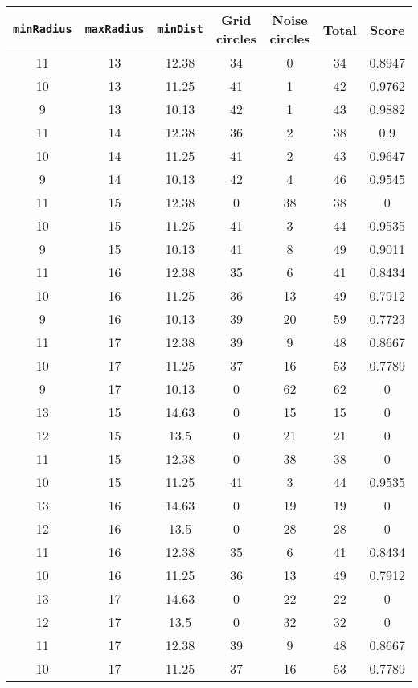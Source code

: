 \documentclass[letterpaper, 12pt]{article}
\begin{document}
\begin{longtable}{|c|c|c|c|c|c|c|}
\hline
\textbf{\texttt{minRadius}} & \textbf{\texttt{maxRadius}} & \textbf{\texttt{minDist}} & \textbf{Grid circles} & \textbf{Noise circles} & \textbf{Total} & \textbf{Score} \\
\hline
11 & 13 & 12.38 & 34 & 0 & 34 & 0.8947 \\
\hline
10 & 13 & 11.25 & 41 & 1 & 42 & 0.9762 \\
\hline
9 & 13 & 10.13 & 42 & 1 & 43 & 0.9882 \\
\hline
11 & 14 & 12.38 & 36 & 2 & 38 & 0.9 \\
\hline
10 & 14 & 11.25 & 41 & 2 & 43 & 0.9647 \\
\hline
9 & 14 & 10.13 & 42 & 4 & 46 & 0.9545 \\
\hline
11 & 15 & 12.38 & 0 & 38 & 38 & 0 \\
\hline
10 & 15 & 11.25 & 41 & 3 & 44 & 0.9535 \\
\hline
9 & 15 & 10.13 & 41 & 8 & 49 & 0.9011 \\
\hline
11 & 16 & 12.38 & 35 & 6 & 41 & 0.8434 \\
\hline
10 & 16 & 11.25 & 36 & 13 & 49 & 0.7912 \\
\hline
9 & 16 & 10.13 & 39 & 20 & 59 & 0.7723 \\
\hline
11 & 17 & 12.38 & 39 & 9 & 48 & 0.8667 \\
\hline
10 & 17 & 11.25 & 37 & 16 & 53 & 0.7789 \\
\hline
9 & 17 & 10.13 & 0 & 62 & 62 & 0 \\
\hline
13 & 15 & 14.63 & 0 & 15 & 15 & 0 \\
\hline
12 & 15 & 13.5 & 0 & 21 & 21 & 0 \\
\hline
11 & 15 & 12.38 & 0 & 38 & 38 & 0 \\
\hline
10 & 15 & 11.25 & 41 & 3 & 44 & 0.9535 \\
\hline
13 & 16 & 14.63 & 0 & 19 & 19 & 0 \\
\hline
12 & 16 & 13.5 & 0 & 28 & 28 & 0 \\
\hline
11 & 16 & 12.38 & 35 & 6 & 41 & 0.8434 \\
\hline
10 & 16 & 11.25 & 36 & 13 & 49 & 0.7912 \\
\hline
13 & 17 & 14.63 & 0 & 22 & 22 & 0 \\
\hline
12 & 17 & 13.5 & 0 & 32 & 32 & 0 \\
\hline
11 & 17 & 12.38 & 39 & 9 & 48 & 0.8667 \\
\hline
10 & 17 & 11.25 & 37 & 16 & 53 & 0.7789 \\

\end{longtable}
\end{document}
